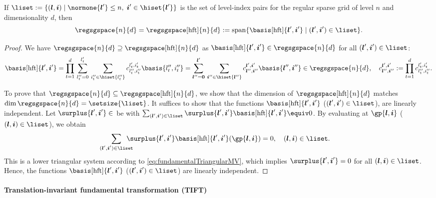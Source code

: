 \begin{proposition}
  \label{prop:hftSparseGridSpace}
  If $\liset := \{(\*l, \*i) \mid
  \normone{\*l'} \le n,\; \*i' \in \hiset{\*l'}\}$
  is the set of level-index pairs for the regular sparse grid of level $n$
  and dimensionality $d$, then
  \begin{equation}
    \regsgspace{n}{d}
    = \regsgspace[\hft]{n}{d}
    := \spn\{\basis[\hft]{\*l',\*i'} \mid (\*l', \*i') \in \liset\}.
  \end{equation}
\end{proposition}

\begin{proof}
  We have $\regsgspace{n}{d} \supset \regsgspace[\hft]{n}{d}$ as
  $\basis[\hft]{\*l',\*i'} \in \regsgspace{n}{d}$
  for all $(\*l', \*i') \in \liset$:
  \begin{equation}
    \basis[\hft]{\*l',\*i'}
    = \prod_{t=1}^d \, \sum_{l''_t=0}^{l'_t} \, \sum_{i''_t \in \hiset{l''_t}}
    c_{l''_t,i''_t}^{l'_t,i'_t} \basis{l''_t,i''_t}
    = \sum_{\*l''=\*0}^{\*l'} \, \sum_{\*i'' \in \hiset{\*l''}}
    c_{\*l'',\*i''}^{\*l',\*i'} \basis{\*l'',\*i''}
    \in \regsgspace{n}{d},\quad
    c_{\*l'',\*i''}^{\*l',\*i'}
    := \prod_{t=1}^d c_{l''_t,i''_t}^{l'_t,i'_t}.
  \end{equation}
  
  To prove that $\regsgspace{n}{d} \subset \regsgspace[\hft]{n}{d}$,
  we show that the dimension of $\regsgspace[\hft]{n}{d}$
  matches $\dim \regsgspace{n}{d} = \setsize{\liset}$.
  It suffices to show that
  the functions $\basis[\hft]{\*l',\*i'}$ ($(\*l', \*i') \in \liset$),
  are linearly independent.
  Let $\surplus{\*l',\*i'} \in \real$ be with
  $\sum_{(\*l', \*i') \in \liset}
  \surplus{\*l',\*i'} \basis[\hft]{\*l',\*i'} \equiv 0$.
  By evaluating at $\gp{\*l,\*i}$ ($(\*l, \*i) \in \liset$), we obtain
  \begin{equation}
    \largesum{(\*l', \*i') \in \liset}
    \surplus{\*l',\*i'} \basis[\hft]{\*l',\*i'}(\gp{\*l,\*i}) = 0,\quad
    (\*l, \*i) \in \liset.
  \end{equation}
  This is a lower triangular system according to
  \eqref{eq:fundamentalTriangularMV},
  which implies $\surplus{\*l',\*i'} = 0$ for all $(\*l, \*i) \in \liset$.
  Hence, the functions $\basis[\hft]{\*l',\*i'}$ ($(\*l', \*i') \in \liset$)
  are linearly independent.
\end{proof}

\paragraph{Translation-invariant fundamental transformation (TIFT)}

